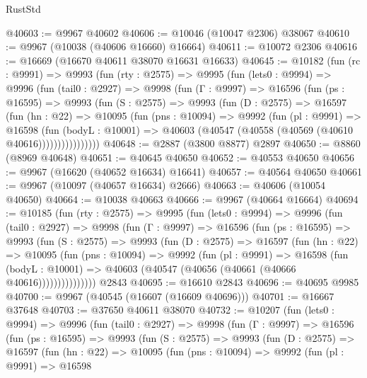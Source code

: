 \begin{lexlean}{RustStd}
\begin{coremodule}
@40603 := @9967 @40602
@40606 := @10046 (@10047 @2306) @38067
@40610 := @9967 (@10038 (@40606 @16660) @16664)
@40611 := @10072 @2306
@40616 := @16669 (@16670 @40611 @38070 @16631 @16633)
@40645 := @10182
    (fun (rc : @9991) =>
    @9993
      (fun (rty : @2575) =>
      @9995
        (fun (lets0 : @9994) =>
        @9996
          (fun (tail0 : @2927) =>
          @9998
            (fun (Γ : @9997) =>
            @16596
              (fun (ps : @16595) =>
              @9993
                (fun (S : @2575) =>
                @9993
                  (fun (D : @2575) =>
                  @16597
                    (fun (hn : @22) =>
                    @10095
                      (fun (pns : @10094) =>
                      @9992
                        (fun (pl : @9991) =>
                        @16598
                          (fun (bodyL : @10001) =>
                          @40603 (@40547 (@40558 (@40569 (@40610 @40616))))))))))))))))
@40648 := @2887 (@3800 @8877) @2897
@40650 := @8860 (@8969 @40648)
@40651 := @40645 @40650
@40652 := @40553 @40650
@40656 := @9967 (@16620 (@40652 @16634) @16641)
@40657 := @40564 @40650
@40661 := @9967 (@10097 (@40657 @16634) @2666)
@40663 := @40606 (@10054 @40650)
@40664 := @10038 @40663
@40666 := @9967 (@40664 @16664)
@40694 := @10185
    (fun (rty : @2575) =>
    @9995
      (fun (lets0 : @9994) =>
      @9996
        (fun (tail0 : @2927) =>
        @9998
          (fun (Γ : @9997) =>
          @16596
            (fun (ps : @16595) =>
            @9993
              (fun (S : @2575) =>
              @9993
                (fun (D : @2575) =>
                @16597
                  (fun (hn : @22) =>
                  @10095
                    (fun (pns : @10094) =>
                    @9992
                      (fun (pl : @9991) =>
                      @16598
                        (fun (bodyL : @10001) =>
                        @40603 (@40547 (@40656 (@40661 (@40666 @40616)))))))))))))))
    @2843
@40695 := @16610 @2843
@40696 := @40695 @9985
@40700 := @9967 (@40545 (@16607 (@16609 @40696)))
@40701 := @16667 @37648
@40703 := @37650 @40611 @38070
@40732 := @10207
    (fun (lets0 : @9994) =>
    @9996
      (fun (tail0 : @2927) =>
      @9998
        (fun (Γ : @9997) =>
        @16596
          (fun (ps : @16595) =>
          @9993
            (fun (S : @2575) =>
            @9993
              (fun (D : @2575) =>
              @16597
                (fun (hn : @22) =>
                @10095
                  (fun (pns : @10094) =>
                  @9992
                    (fun (pl : @9991) =>
                    @16598

\end{coremodule}
\end{lexlean}
